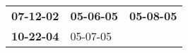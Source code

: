 \begin{supertabular}{p{0.33\columnwidth}p{0.33\columnwidth}p{0.33\columnwidth}}
 \textbf{07-12-02\textsuperscript{}} &  \textbf{05-06-05\textsuperscript{}} &  \textbf{05-08-05\textsuperscript{}} \\
 \textbf{10-22-04\textsuperscript{}} &           05-07-05\textsuperscript{} &                                      \\
\end{supertabular}
